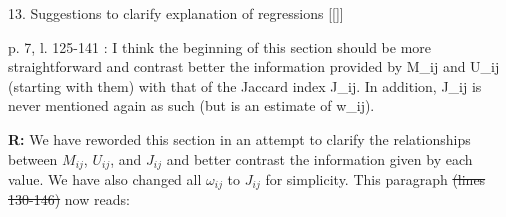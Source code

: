 \documentclass[12pt]{letter}
\newenvironment{refquote}{\bigskip \begin{it}}{\end{it}\smallskip}
\providecommand{\DIFadd}[1]{{\protect\color{blue}\uwave{#1}}} %
\providecommand{\DIFdel}[1]{{\protect\color{red}\sout{#1}}}                      %
\providecommand{\DIFaddbegin}{} %
\providecommand{\DIFaddend}{} %
\providecommand{\DIFdelbegin}{} %
\providecommand{\DIFdelend}{} %
\newcommand{\DIFscaledelfig}{0.5}
\newlength{\DIFdelgraphicswidth} %
\newlength{\DIFdelgraphicsheight} %
\newcommand{\DIFaddincludegraphics}[2][]{{\color{blue}\fbox{\DIFOincludegraphics[#1]{#2}}}} %
\newcommand{\DIFdelincludegraphics}[2][]{%
\sbox{\DIFdelgraphicsbox}{\DIFOincludegraphics[#1]{#2}}%
\settoboxwidth{\DIFdelgraphicswidth}{\DIFdelgraphicsbox} %
\settoboxtotalheight{\DIFdelgraphicsheight}{\DIFdelgraphicsbox} %
\scalebox{\DIFscaledelfig}{%
\parbox[b]{\DIFdelgraphicswidth}{\usebox{\DIFdelgraphicsbox}\\[-\baselineskip] \rule{\DIFdelgraphicswidth}{0em}}\llap{\resizebox{\DIFdelgraphicswidth}{\DIFdelgraphicsheight}{%
\setlength{\unitlength}{\DIFdelgraphicswidth}%
\begin{picture}(1,1)%
\thicklines\linethickness{2pt} %
{\color[rgb]{1,0,0}\put(0,0){\framebox(1,1){}}}%
{\color[rgb]{1,0,0}\put(0,0){\line( 1,1){1}}}%
{\color[rgb]{1,0,0}\put(0,1){\line(1,-1){1}}}%
\end{picture}%
}\hspace*{3pt}}} %
} %
\DeclareRobustCommand{\DIFaddbegin}{\DIFOaddbegin \let\includegraphics\DIFaddincludegraphics} %
\DeclareRobustCommand{\DIFaddend}{\DIFOaddend \let\includegraphics\DIFOincludegraphics} %
\DeclareRobustCommand{\DIFdelbegin}{\DIFOdelbegin \let\includegraphics\DIFdelincludegraphics} %
\DeclareRobustCommand{\DIFdelend}{\DIFOaddend \let\includegraphics\DIFOincludegraphics} %
\begin{document}
13. Suggestions to clarify explanation of regressions \DIFaddbegin [[\DIFadd{done?}]]
\DIFaddend 

	\begin{refquote}
		p. 7, l. 125-141 : I think the beginning of this section should be more straightforward and contrast better the information provided by M\_ij and U\_ij (starting with them) with that of the Jaccard index J\_ij. In addition, J\_ij is never mentioned again as such (but is an estimate of w\_ij).
	\end{refquote}


	\textbf{R:} We have reworded this section in an attempt to clarify the relationships between $M_{ij}$, $U_{ij}$, and $J_{ij}$ and better contrast the information given by each value. We have also changed all $\omega_{ij}$ to $J_{ij}$ for simplicity. This paragraph \DIFdelbegin \DIFdel{(lines 130-146) }\DIFdelend now reads:
\end{document}
